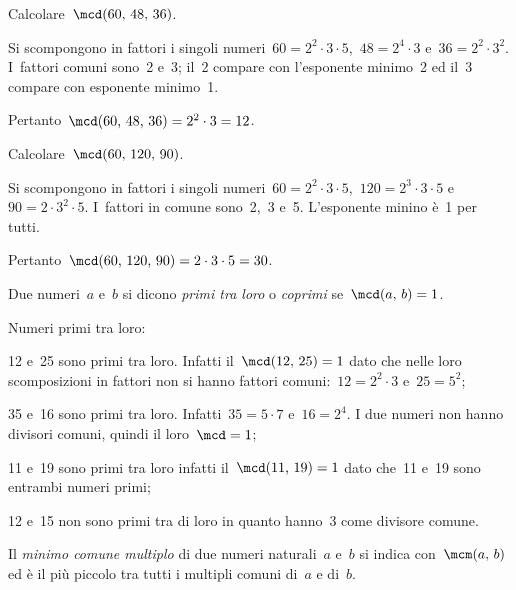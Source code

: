 \begin{exrig}
 \begin{esempio}
 Calcolare~$\mcd(60\text{,~}48\text{,~}36)$.

Si scompongono in fattori i singoli numeri~$60=2^2\cdot 3\cdot 5$,~$48=2^4\cdot 3$ e~$36 =2^2\cdot 3^2$.
I~fattori comuni sono~2 e~3; il~2 compare con l'esponente minimo~2 ed il~3 compare con esponente
minimo~1.

Pertanto~$\mcd(60\text{,~}48\text{,~}36)=2^2\cdot 3=12$.

 \end{esempio}

 \begin{esempio}
 Calcolare~$\mcd(60\text{,~}120\text{,~}90)$.

Si scompongono in fattori i singoli numeri~$60=2^2\cdot 3\cdot 5$,~$120=2^3\cdot 3\cdot 5$ e~$90=2\cdot 3^2\cdot 5$.
I~fattori in comune sono~2,~3 e~5. L'esponente minino è~1 per tutti.

Pertanto~$\mcd(60\text{,~}120\text{,~}90)=2\cdot 3\cdot 5=30$.
 \end{esempio}
\end{exrig}


\begin{definizione}
 Due numeri~$a$ e~$b$ si dicono \emph{primi tra loro} o \emph{coprimi} se~$\mcd(a\text{,~}b)=1$.
\end{definizione}

\begin{exrig}
 \begin{esempio}
 Numeri primi tra loro:
 \begin{itemize*}
 \item 12 e~25 sono primi tra loro. Infatti il~$\mcd(12\text{,~}25)=1$ dato che nelle loro scomposizioni in
fattori non si hanno fattori comuni:~$12=2^2\cdot 3$ e~$25=5^2$;
 \item 35 e~16 sono primi tra loro. Infatti~$35=5\cdot 7$ e~$16=2^4$. I due numeri non hanno
divisori comuni, quindi il loro~$\mcd=1$;
 \item 11 e~19 sono primi tra loro infatti il~$\mcd(11\text{,~}19)=1$ dato che~11 e~19 sono entrambi numeri primi;
 \item 12 e~15 non sono primi tra di loro in quanto hanno~3 come divisore comune.
 \end{itemize*}
 \end{esempio}
\end{exrig}


\begin{definizione}
 Il \emph{minimo comune multiplo} di due numeri naturali~$a$ e~$b$ si indica con~$\mcm(a\text{,~}b)$ ed è il più
piccolo tra tutti i multipli comuni di~$a$ e di~$b$.
\end{definizione}

